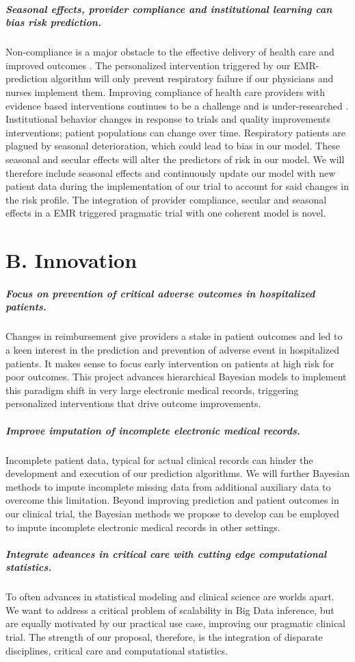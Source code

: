 \documentclass[11pt,notitlepage]{article}
\begin{document}
\subparagraph*{Seasonal effects, provider compliance and institutional learning can bias risk prediction.} 
Non-compliance is a major obstacle to the effective delivery of health care and improved outcomes \cite{Duncan_16710766}. The personalized intervention triggered by our EMR-prediction algorithm will only prevent respiratory failure if our physicians and nurses implement them. Improving compliance of health care providers with evidence based interventions continues to be a challenge and is under-researched \cite{Davis_7650822}. Institutional behavior changes in response to trials and quality improvements interventions; patient populations can change over time. Respiratory patients are plagued by seasonal deterioration, which could lead to bias in our model. These seasonal and secular effects will alter the predictors of risk in our model. We will therefore include seasonal effects and continuously update our model with new patient data during the implementation of our trial to account for said changes in the risk profile. The integration of provider compliance, secular and seasonal effects in a EMR triggered pragmatic trial with one coherent model is novel. 

\section*{B. Innovation}
\subparagraph*{Focus on prevention of critical adverse outcomes in hospitalized patients.}
Changes in reimbursement give providers a stake in patient outcomes and led to a keen interest in the prediction and prevention of adverse event in hospitalized patients. It makes sense to focus early intervention on patients at high risk for poor outcomes. This project advances hierarchical Bayesian models to implement this paradigm shift in very large electronic medical records, triggering personalized interventions that drive outcome improvements.

\subparagraph*{Improve imputation of incomplete electronic medical records.}
Incomplete patient data, typical for actual clinical records can hinder the development and execution of our prediction algorithms. We will further Bayesian methods to impute incomplete missing data from additional auxiliary data to overcome this limitation. Beyond improving prediction and patient outcomes in our clinical trial, the Bayesian methods we propose to develop can be employed to impute incomplete electronic medical records in other settings.

\subparagraph*{Integrate advances in critical care with cutting edge computational statistics.}
To often advances in statistical modeling and clinical science are worlds apart. We want to address a critical problem of scalability in Big Data inference, but are equally motivated by our practical use case, improving our pragmatic clinical trial. The strength of our proposal, therefore, is the integration of disparate disciplines, critical care and computational statistics. 
\end{document}
